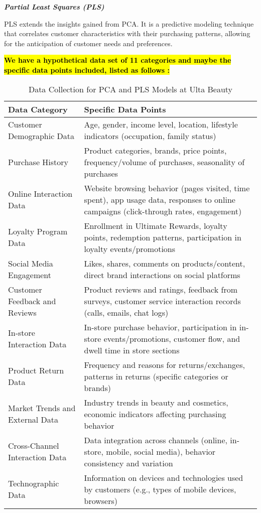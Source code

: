 \documentclass{article}
\begin{document}
\textit{\textbf{Partial Least Squares (PLS)}}\par
PLS extends the insights gained from PCA. It is a predictive modeling technique that correlates customer characteristics with their purchasing patterns, allowing for the anticipation of customer needs and preferences.\par
\textbf{\hl{We have a hypothetical data set of 11 categories and maybe the specific data points included, listed as follows :}}
\begin{table}[H]
\centering
\begin{tabular}{|l|p{10cm}|}
\hline
\textbf{Data Category} & \textbf{Specific Data Points} \\
\hline
Customer Demographic Data & Age, gender, income level, location, lifestyle indicators (occupation, family status) \\
\hline
Purchase History & Product categories, brands, price points, frequency/volume of purchases, seasonality of purchases \\
\hline
Online Interaction Data & Website browsing behavior (pages visited, time spent), app usage data, responses to online campaigns (click-through rates, engagement) \\
\hline
Loyalty Program Data & Enrollment in Ultimate Rewards, loyalty points, redemption patterns, participation in loyalty events/promotions \\
\hline
Social Media Engagement & Likes, shares, comments on products/content, direct brand interactions on social platforms \\
\hline
Customer Feedback and Reviews & Product reviews and ratings, feedback from surveys, customer service interaction records (calls, emails, chat logs) \\
\hline
In-store Interaction Data & In-store purchase behavior, participation in in-store events/promotions, customer flow, and dwell time in store sections \\
\hline
Product Return Data & Frequency and reasons for returns/exchanges, patterns in returns (specific categories or brands) \\
\hline
Market Trends and External Data & Industry trends in beauty and cosmetics, economic indicators affecting purchasing behavior \\
\hline
Cross-Channel Interaction Data & Data integration across channels (online, in-store, mobile, social media), behavior consistency and variation \\
\hline
Technographic Data & Information on devices and technologies used by customers (e.g., types of mobile devices, browsers) \\
\hline
\end{tabular}
\caption{Data Collection for PCA and PLS Models at Ulta Beauty}
\label{table:data_collection}
\end{table}
\end{document}
